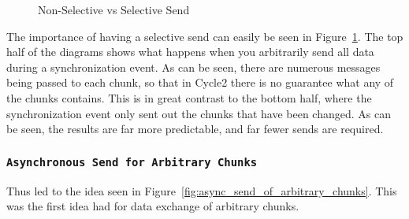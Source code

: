 \documentclass[thesis.tex]{subfiles}
\begin{document}
\begin{figure}[htbp]

      \caption{Non-Selective vs Selective Send}
      \label{fig:selective_send}
    \end{figure}

    The importance of having a selective send can easily be seen in Figure~\ref{fig:selective_send}. The top half of the diagrams shows what happens when you arbitrarily send all data during a synchronization event. As can be seen, there are numerous messages being passed to each chunk, so that in Cycle2 there is no guarantee what any of the chunks contains. This is in great contrast to the bottom half, where the synchronization event only sent out the chunks that have been changed. As can be seen, the results are far more predictable, and far fewer sends are required.


  \subsubsection{\texttt{Asynchronous Send for Arbitrary Chunks}} %
  \label{ssub:asynchronous_send_for_arbitrary_chunks}
   

    Thus led to the idea seen in Figure~\ref{fig:async_send_of_arbitrary_chunks}. This was the first idea had for data exchange of arbitrary chunks.
\end{document}
